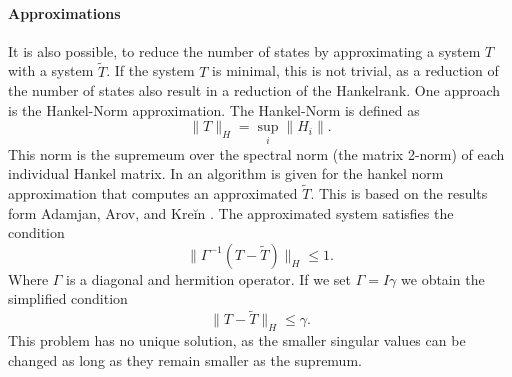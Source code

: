 \documentclass[doctype=mastersthesis,BCOR=15mm,biblatex]{ldvbook}%
\newcommand{\eye}{I} %
\begin{document}
\paragraph{Approximations}
It is also possible, to reduce the number of states by approximating a system $T$ with a system $\tilde{T}$.
If the system $T$ is minimal, this is not trivial, as a reduction of the number of states also result in a reduction of the Hankelrank.
One approach is the Hankel-Norm approximation.
The Hankel-Norm is defined as
\begin{equation}
	\|T\|_H = \sup_{i}\|H_i\|.
\end{equation}
This norm is the supremeum over the spectral norm (the matrix 2-norm) of each individual Hankel matrix.
In \cite{dewilde_time-varying_1998} an algorithm is given for the hankel norm approximation that computes an approximated $\tilde{T}$.  
This is based on the results form Adamjan, Arov, and Kreĭn \cite{adamjan_analytic_1971}.
The approximated system satisfies the condition
\begin{equation}
	\| \Gamma^{-1}(T-\tilde{T})\|_H \leq 1.
\end{equation}
Where $\Gamma$ is a diagonal and hermition operator. 
If we set $\Gamma = \eye\gamma$ we obtain the simplified condition
\begin{equation}
	\|T-\tilde{T}\|_H \leq \gamma.
\end{equation}
This problem has no unique solution, as the smaller singular values can be changed as long as they remain smaller as the supremum.
\end{document}
